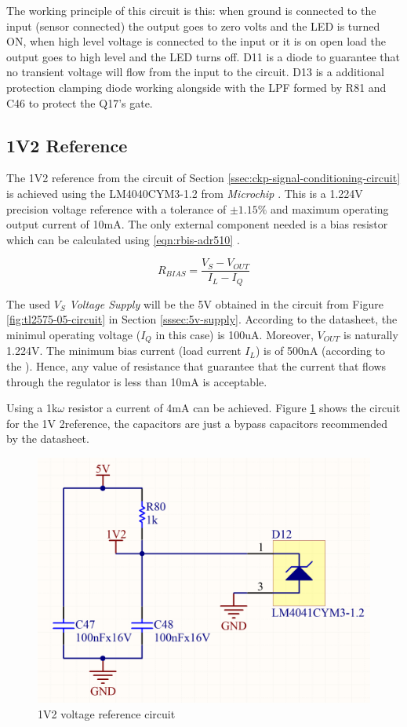 		The working principle of this circuit is this: when ground is connected to the input (sensor connected) the output goes to zero volts and the LED is turned ON, when high level voltage is connected to the input or it is on open load the output goes to high level and the LED turns off. D11 is a diode to guarantee that no transient voltage will flow from the input to the circuit. D13 is a additional protection clamping diode working alongside with the LPF formed by R81 and C46 to protect the Q17's gate.

	\subsection{1V2 Reference}\label{sssec:1v2-reference}

			The 1V2 reference from the circuit of Section \ref{ssec:ckp-signal-conditioning-circuit} is achieved using the LM4040CYM3-1.2 from \textit{Microchip} \cite{lm4040-datasheet}. This is a 1.224V precision voltage reference with a tolerance of $\pm 1.15\%$ and maximum operating output current of 10mA. The only external component needed is a bias resistor which can be calculated using \ref{eqn:rbis-adr510} \cite{lm4040-datasheet}.

			\begin{equation}\label{eqn:rbis-adr510}
				R_{BIAS} = \frac{V_{S} - V_{OUT}}{I_{L} - I_{Q}}
			\end{equation}

			The used $V_{S}$ \textit{Voltage Supply} will be the 5V obtained in the circuit from Figure \ref{fig:tl2575-05-circuit} in Section \ref{sssec:5v-supply}. According to the datasheet, the minimul operating voltage ($I_{Q}$ in this case) is 100uA. Moreover, $V_{OUT}$ is naturally 1.224V. The minimum bias current (load current $I_{L}$) is of 500nA (according to the \cite{lm2907-datasheet}). Hence, any value of resistance that guarantee that the current that flows through the regulator is less than 10mA is acceptable.
			\par
			Using a 1k$\omega$ resistor a current of 4mA can be achieved. Figure \ref{fig:1v2-circuit} shows the circuit for the 1V 2reference, the capacitors are just a bypass capacitors recommended by the datasheet.

			\begin{figure}[htbp]
				\centering
					\includegraphics[scale=1.2]{figuras/fig-1v2-circuit}
				\caption{1V2 voltage reference circuit}
				\label{fig:1v2-circuit}
			\end{figure}	 
